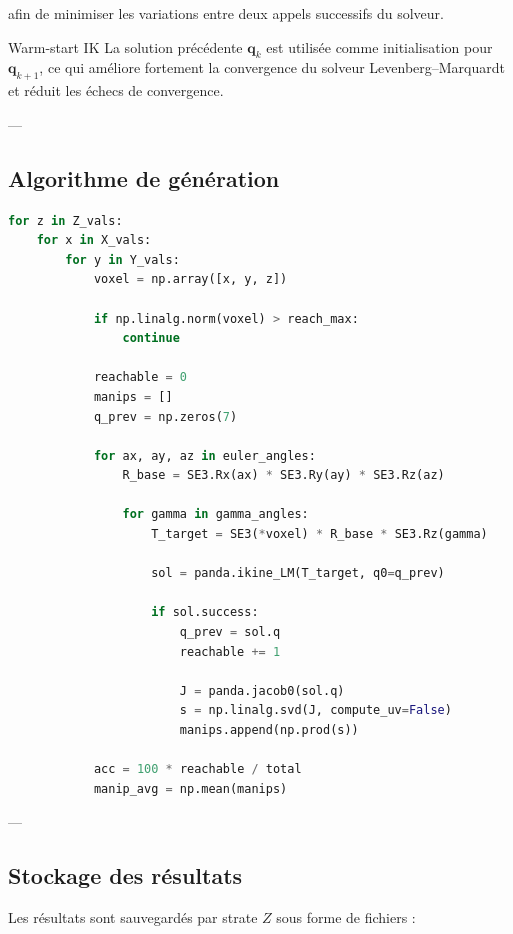\documentclass[11pt, a4paper]{article}
\begin{document}
afin de minimiser les variations entre deux appels successifs du solveur.

\begin{techbox}{Warm-start IK}
La solution précédente $\mathbf{q}_k$ est utilisée comme initialisation pour $\mathbf{q}_{k+1}$, ce qui améliore fortement la convergence du solveur Levenberg–Marquardt et réduit les échecs de convergence.
\end{techbox}

---

\subsection{Algorithme de génération}

\begin{lstlisting}[language=python, caption={Génération de la carte de capacité (IK + manipulabilité)}]
for z in Z_vals:
    for x in X_vals:
        for y in Y_vals:
            voxel = np.array([x, y, z])

            if np.linalg.norm(voxel) > reach_max:
                continue

            reachable = 0
            manips = []
            q_prev = np.zeros(7)

            for ax, ay, az in euler_angles:
                R_base = SE3.Rx(ax) * SE3.Ry(ay) * SE3.Rz(az)

                for gamma in gamma_angles:
                    T_target = SE3(*voxel) * R_base * SE3.Rz(gamma)

                    sol = panda.ikine_LM(T_target, q0=q_prev)

                    if sol.success:
                        q_prev = sol.q
                        reachable += 1

                        J = panda.jacob0(sol.q)
                        s = np.linalg.svd(J, compute_uv=False)
                        manips.append(np.prod(s))

            acc = 100 * reachable / total
            manip_avg = np.mean(manips)
\end{lstlisting}

---

\subsection{Stockage des résultats}

Les résultats sont sauvegardés par strate $Z$ sous forme de fichiers :
\end{document}
